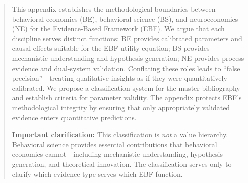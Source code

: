 \documentclass[11pt, a4paper]{article}
\begin{document}

\begin{abstract}
This appendix establishes the methodological boundaries between behavioral economics (BE), behavioral science (BS), and neuroeconomics (NE) for the Evidence-Based Framework (EBF). We argue that each discipline serves distinct functions: BE provides calibrated parameters and causal effects suitable for the EBF utility equation; BS provides mechanistic understanding and hypothesis generation; NE provides process evidence and dual-system validation. Conflating these roles leads to ``false precision''---treating qualitative insights as if they were quantitatively calibrated. We propose a classification system for the master bibliography and establish criteria for parameter validity. The appendix protects EBF's methodological integrity by ensuring that only appropriately validated evidence enters quantitative predictions.

\textbf{Important clarification:} This classification is \textit{not} a value hierarchy. Behavioral science provides essential contributions that behavioral economics cannot---including mechanistic understanding, hypothesis generation, and theoretical innovation. The classification serves only to clarify which evidence type serves which EBF function.
\end{abstract}

\end{document}
